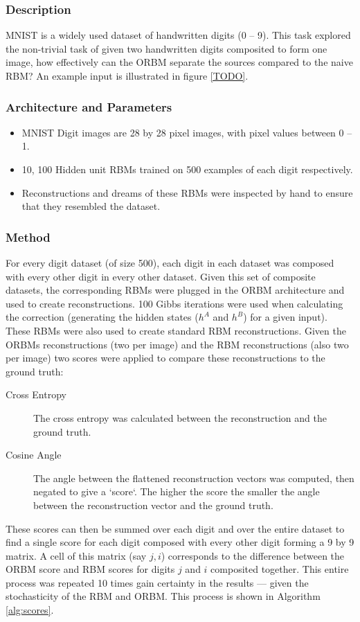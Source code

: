     \subsubsection{Description}

    MNIST is a widely used dataset of handwritten digits (0 -- 9). This task explored the non-trivial task of given two handwritten digits composited to form one image, how effectively can the ORBM separate the sources compared to the naive RBM? An example input is illustrated in figure \ref{TODO}.

    \subsubsection{Architecture and Parameters}

    \begin{itemize}
      \item MNIST Digit images are 28 by 28 pixel images, with pixel values between 0 -- 1.
      \item 10, 100 Hidden unit RBMs trained on 500 examples of each digit respectively.
      \item Reconstructions and dreams of these RBMs were inspected by hand to ensure that they resembled the dataset.
    \end{itemize}

    \subsubsection{Method}

    For every digit dataset (of size 500), each digit in each dataset was composed with every other digit in every other dataset. Given this set of composite datasets, the corresponding RBMs were plugged in the ORBM architecture and used to create reconstructions. 100 Gibbs iterations were used when calculating the correction (generating the hidden states ($h^A$ and $h^B$) for a given input). These RBMs were also used to create standard RBM reconstructions.
    Given the ORBMs reconstructions (two per image) and the RBM reconstructions (also two per image) two scores were applied to compare these reconstructions to the ground truth:
    \begin{description}
      \item[Cross Entropy] The cross entropy was calculated between the reconstruction and the ground truth.
      \item[Cosine Angle] The angle between the flattened reconstruction vectors was computed, then negated to give a `score`. The higher the score the smaller the angle between the reconstruction vector and the ground truth.
    \end{description}
    These scores can then be summed over each digit and over the entire dataset to find a single score for each digit composed with every other digit forming a 9 by 9 matrix. A cell of this matrix (say $j,i$) corresponds to the difference between the ORBM score and RBM scores for digits $j$ and $i$ composited together. This entire process was repeated 10 times gain certainty in the results --- given the stochasticity of the RBM and ORBM. This process is shown in Algorithm \ref{alg:scores}.

